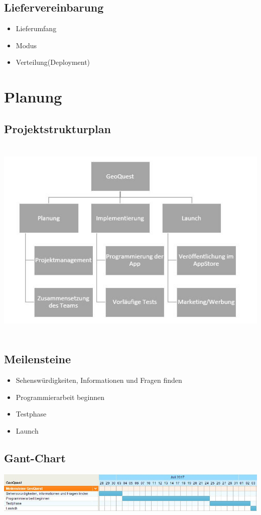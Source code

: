 \subsection{Liefervereinbarung}
\begin{itemize}
	\item Lieferumfang
	\item Modus
	\item Verteilung(Deployment)
\end{itemize}
\section{Planung}
\subsection{Projektstrukturplan}
\includegraphics[height=10cm]{Projektstrukturplan}\\
\subsection{Meilensteine}
\begin{itemize}
	\item Sehenswürdigkeiten, Informationen und Fragen finden
	\item Programmierarbeit beginnen
	\item Testphase
	\item Launch
\end{itemize}
\subsection{Gant-Chart}
\includegraphics[width=15cm]{gantchart}\\
